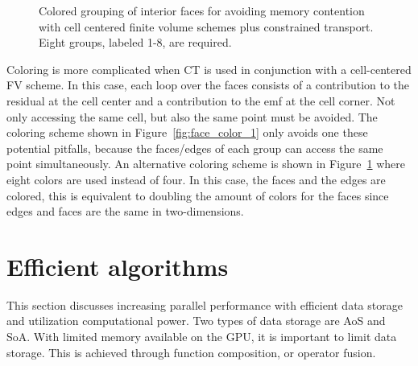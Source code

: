 \begin{figure}[htbp]\figSpace
\begin{center}

\end{center}
\caption{Colored grouping of interior faces for avoiding memory contention with cell centered finite volume schemes plus constrained transport.  Eight groups, labeled 1-8, are required.}
\label{fig:face_color_2}
\figSpace
\end{figure}

Coloring is more complicated when CT is used in conjunction with a cell-centered FV scheme.  In this case, each loop over the faces consists of a contribution to the residual at the cell center and a contribution to the emf at the cell corner.  Not only accessing the same cell, but also the same point must be avoided.  The coloring scheme shown in Figure~\ref{fig:face_color_1} only avoids one these potential pitfalls, because the faces/edges of each group can access the same point simultaneously.  An alternative coloring scheme is shown in Figure~\ref{fig:face_color_2} where eight colors are used instead of four.  In this case, the faces and the edges are colored,  this is equivalent to doubling the amount of colors for the faces since edges and faces are the same in two-dimensions.

\section[Efficient algorithms]{Efficient algorithms}
\label{sec:efficient_algo}

This section discusses increasing parallel performance with efficient data storage and utilization computational power.  Two types of data storage are AoS and SoA.  With limited memory available on the GPU, it is important to limit data storage.  This is achieved through function composition, or operator fusion.

